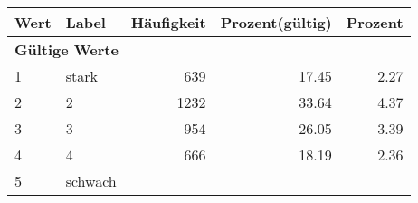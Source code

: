      \begin{longtable}{lXrrr}
     \toprule
     \textbf{Wert} & \textbf{Label} & \textbf{Häufigkeit} & \textbf{Prozent(gültig)} & \textbf{Prozent} \\
     \endhead
     \midrule
     \multicolumn{5}{l}{\textbf{Gültige Werte}}\\

     1 &
     \multicolumn{1}{X}{ stark   } &


       \num{639} &
       \num[round-mode=places,round-precision=2]{17.45} &
         \num[round-mode=places,round-precision=2]{2.27} \\

     2 &
     \multicolumn{1}{X}{ 2   } &


       \num{1232} &
       \num[round-mode=places,round-precision=2]{33.64} &
         \num[round-mode=places,round-precision=2]{4.37} \\

     3 &
     \multicolumn{1}{X}{ 3   } &


       \num{954} &
       \num[round-mode=places,round-precision=2]{26.05} &
         \num[round-mode=places,round-precision=2]{3.39} \\

     4 &
     \multicolumn{1}{X}{ 4   } &


       \num{666} &
       \num[round-mode=places,round-precision=2]{18.19} &
         \num[round-mode=places,round-precision=2]{2.36} \\

     5 &
     \multicolumn{1}{X}{ schwach   } &



\end{longtable}
